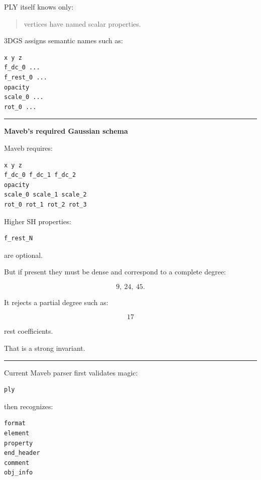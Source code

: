 PLY itself knows only:

\begin{quote}
vertices have named scalar properties.
\end{quote}

3DGS assigns semantic names such as:

\protect{}\label{f1u91b}%
\begin{verbatim}
x y z
f_dc_0 ...
f_rest_0 ...
opacity
scale_0 ...
rot_0 ...
\end{verbatim}

\begin{center}\rule{0.5\linewidth}{0.5pt}\end{center}

\textbf{Maveb's required Gaussian schema}

Maveb requires:

\protect{}\label{8jo8qo}%
\begin{verbatim}
x y z
f_dc_0 f_dc_1 f_dc_2
opacity
scale_0 scale_1 scale_2
rot_0 rot_1 rot_2 rot_3
\end{verbatim}

Higher SH properties:

\protect{}\label{m1flmm}%
\begin{verbatim}
f_rest_N
\end{verbatim}

are optional.

But if present they must be dense and correspond to a complete degree:

\[
9,\ 24,\ 45.
\]

It rejects a partial degree such as:

\[
17
\]

rest coefficients.

That is a strong invariant.

\begin{center}\rule{0.5\linewidth}{0.5pt}\end{center}

Current Maveb parser first validates magic:

\protect{}\label{czuxw1}%
\begin{verbatim}
ply
\end{verbatim}

then recognizes:

\protect{}\label{qlh0ei}%
\begin{verbatim}
format
element
property
end_header
comment
obj_info
\end{verbatim}

